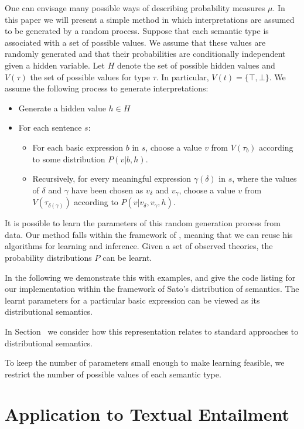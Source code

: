 \documentclass[letterpaper]{article}
\newcommand{\citet}[1]{\citeauthor{#1} \shortcite{#1}}
\begin{document}
One can envisage many possible ways of describing probability measures
$\mu$. In this paper we will present a simple method in which
interpretations are assumed to be generated by a random process. Suppose that each semantic type is associated with a set of possible values. 
We assume that these values are randomly generated and that their
probabilities are conditionally independent given a hidden
variable. Let $H$ denote the set of possible hidden values and $V(\tau)$  the
set of possible values for type $\tau$. In particular, $V(t) = \{\top, \bot\}$. We assume the following process to generate
interpretations:
\begin{itemize}
\item Generate a hidden value $h\in H$
\item For each sentence $s$:
\begin{itemize}
\item For each basic expression $b$ in $s$, choose a value $v$ from
  $V(\tau_b)$ according to some distribution $P(v|b,h)$.
\item Recursively, for every meaningful expression $\gamma(\delta)$ in
  $s$, where the values of $\delta$ and $\gamma$ have been chosen as
  $v_\delta$ and $v_\gamma$, choose a value $v$ from
  $V(\tau_{\delta(\gamma)})$ according to $P(v|v_\delta, v_\gamma,
  h)$.
\end{itemize}
\end{itemize}

It is possible to learn the parameters of this random
generation process from data.  Our method falls within the framework of
 \citet{Sato:95}, meaning that we can reuse his algorithms
for learning and inference. Given a set of observed theories, the probability distributions $P$
can be learnt. 

In the following we demonstrate this with
examples, and give the code listing for our implementation within the framework of Sato's distribution of semantics. The learnt parameters for a particular basic
expression can be viewed as its distributional semantics. 

In Section~ we consider how this representation relates to standard
approaches to distributional semantics.

To keep the number of parameters small enough to make learning
feasible, we restrict the number of possible values of each semantic
type.

\section{Application to Textual Entailment}
\end{document}

